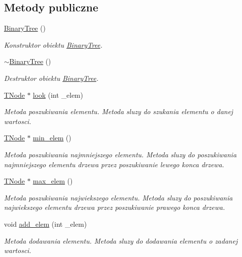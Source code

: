 \subsection*{Metody publiczne}
\begin{DoxyCompactItemize}
\item 
\hyperlink{struct_binary_tree_adf45bce605436b26c353b87e27bffe50}{Binary\-Tree} ()
\begin{DoxyCompactList}\small\item\em Konstruktor obiektu \hyperlink{struct_binary_tree}{Binary\-Tree}. \end{DoxyCompactList}\item 
\hyperlink{struct_binary_tree_a48c23a22a8400765d099e0e6fcebc236}{$\sim$\-Binary\-Tree} ()
\begin{DoxyCompactList}\small\item\em Destruktor obiektu \hyperlink{struct_binary_tree}{Binary\-Tree}. \end{DoxyCompactList}\item 
\hyperlink{struct_t_node}{T\-Node} $\ast$ \hyperlink{struct_binary_tree_a478377892185d59a6af540ad1e667898}{look} (int \-\_\-elem)
\begin{DoxyCompactList}\small\item\em Metoda poszukiwania elementu. Metoda sluzy do szukania elementu o danej wartosci. \end{DoxyCompactList}\item 
\hyperlink{struct_t_node}{T\-Node} $\ast$ \hyperlink{struct_binary_tree_a224960241e35019ce084f25632a4dbcd}{min\-\_\-elem} ()
\begin{DoxyCompactList}\small\item\em Metoda poszukiwania najmniejszego elementu. Metoda sluzy do poszukiwania najmniejszego elementu drzewa przez poszukiwanie lewego konca drzewa. \end{DoxyCompactList}\item 
\hyperlink{struct_t_node}{T\-Node} $\ast$ \hyperlink{struct_binary_tree_a858b64e28ff27071b08ec57af7ea1f50}{max\-\_\-elem} ()
\begin{DoxyCompactList}\small\item\em Metoda poszukiwania najwiekszego elementu. Metoda sluzy do poszukiwania najwiekszego elementu drzewa przez poszukiwanie prawego konca drzewa. \end{DoxyCompactList}\item 
void \hyperlink{struct_binary_tree_a2cba03e2583aa1aaba6e610e21fb7521}{add\-\_\-elem} (int \-\_\-elem)
\begin{DoxyCompactList}\small\item\em Metoda dodawania elementu. Metoda sluzy do dodawania elementu o zadanej wartosci. \end{DoxyCompactList}\item 

\end{DoxyCompactItemize}
